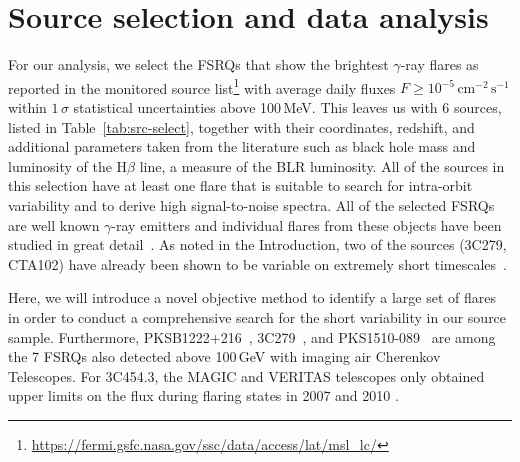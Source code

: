 \documentclass[twocolumn,linenumbers]{aastex62}
\newcommand{\gray}{$\gamma$-ray\xspace}
\begin{document}
\section{Source selection and data analysis}
\label{sec:data}

For our analysis, we select the FSRQs that show the brightest \gray flares as reported in the monitored source list\footnote{\url{https://fermi.gsfc.nasa.gov/ssc/data/access/lat/msl_lc/}}
with average daily fluxes $F \geqslant 10^{-5}\,\mathrm{cm}^{-2}\,\mathrm{s}^{-1}$ within $1\,\sigma$ statistical uncertainties above 100\,MeV.
This leaves us with 6 sources, listed in Table~\ref{tab:src-select}, together with their coordinates, redshift, and additional parameters taken from the literature such as black hole mass and luminosity of the $\mathrm{H}\beta$ line, a measure of the BLR luminosity.  
All of the sources in this selection have at least one 
flare that is suitable
to search for intra-orbit variability and to derive high signal-to-noise spectra. 
All of the selected FSRQs are well known \gray emitters and individual flares from these objects have been studied in great detail~\citep[e.g.,][]{2010ApJ...714L..73A,2011ApJ...733...19T,2015ApJ...808L..48P,TheFermi-LAT:2016dss,2013ApJ...766L..11S,2015ApJ...809..164D,2018ApJ...854L..26S,2018A&A...617A..59K,2011ApJ...733L..26A}. 
As noted in the Introduction, two of the sources (3C279, CTA102) have already been shown to be variable on extremely short timescales~\citep{TheFermi-LAT:2016dss,2018ApJ...854L..26S}. 

Here, we will introduce a novel objective method to identify a large set of flares in order to conduct a comprehensive search for the short variability in our source sample.  
Furthermore, PKSB1222+216~\citep{2011ApJ...730L...8A}, 3C279~\citep{2008Sci...320.1752M}, and PKS1510-089~\citep{2011ApJ...730L...8A,2013A&A...554A.107H,2014A&A...569A..46A}  are among the 7 FSRQs also detected above 100\,GeV with imaging air Cherenkov Telescopes. 
For 3C454.3, the MAGIC and VERITAS telescopes only obtained upper limits on the flux during flaring states in 2007 \citep{2009A&A...498...83A} and 2010 \citep{2016AJ....151..142A}.
\end{document}
